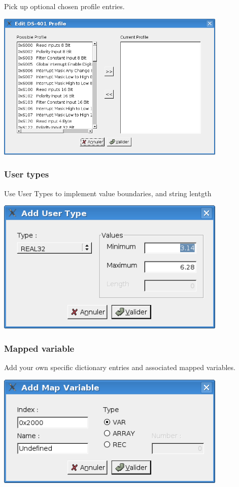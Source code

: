 \documentclass[a4paper,12pt]{book}
\begin{document}
Pick up optional chosen profile entries.\newline
 \begin{center}
   \includegraphics[width=11cm]{Pictures/10000201000002DE000001D82D89C224.png}
\end{center}

\subsubsection{User types}
Use User Types to implement value boundaries, and string lentgth\newline
 \begin{center}
   \includegraphics[width=11cm]{Pictures/10000201000001C40000010766961D7F.png}
\end{center}

\subsubsection{Mapped variable}
Add your own specific dictionary entries and associated mapped
variables.\newline
 \begin{center}
   \includegraphics[width=11cm]{Pictures/10000201000001C4000000DD129D4661.png}
\end{center}
\end{document}
